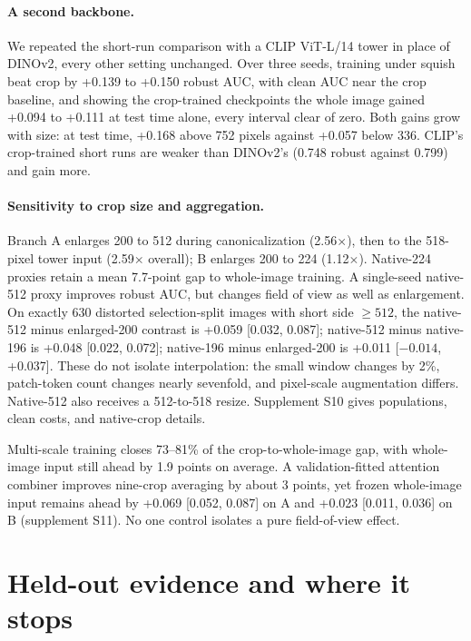 \documentclass[letterpaper]{article} %
\begin{document}
\paragraph{A second backbone.} We repeated the short-run comparison with a CLIP
ViT-L/14 tower \cite{radford2021clip} in place of DINOv2, every other setting
unchanged. Over three seeds, training under squish beat crop by +0.139 to
+0.150 robust AUC, with clean AUC near the crop baseline, and showing the crop-trained
checkpoints the whole image gained +0.094 to +0.111 at test time alone, every
interval clear of zero. Both gains grow with size: at test time, +0.168 above
752 pixels against +0.057 below 336. CLIP's crop-trained short runs are weaker
than DINOv2's (0.748 robust against 0.799) and gain more.

\paragraph{Sensitivity to crop size and aggregation.} Branch A enlarges 200 to 512 during canonicalization (2.56$\times$), then to the 518-pixel tower input (2.59$\times$ overall); B enlarges 200 to 224 (1.12$\times$). Native-224 proxies retain a mean 7.7-point gap to whole-image training. A single-seed native-512 proxy improves robust AUC, but changes field of view as well as enlargement. On exactly 630 distorted selection-split images with short side $\geq512$, the native-512 minus enlarged-200 contrast is +0.059 [0.032, 0.087]; native-512 minus native-196 is +0.048 [0.022, 0.072]; native-196 minus enlarged-200 is +0.011 [$-0.014$, +0.037]. These do not isolate interpolation: the small window changes by 2\%, patch-token count changes nearly sevenfold, and pixel-scale augmentation differs. Native-512 also receives a 512-to-518 resize. Supplement S10 gives populations, clean costs, and native-crop details.

Multi-scale training closes 73--81\% of the crop-to-whole-image gap, with whole-image input still ahead by 1.9 points on average. A validation-fitted attention combiner improves nine-crop averaging by about 3 points, yet frozen whole-image input remains ahead by +0.069 [0.052, 0.087] on A and +0.023 [0.011, 0.036] on B (supplement S11). No one control isolates a pure field-of-view effect.

\section{Held-out evidence and where it stops}
\label{sec:heldout}
\end{document}
